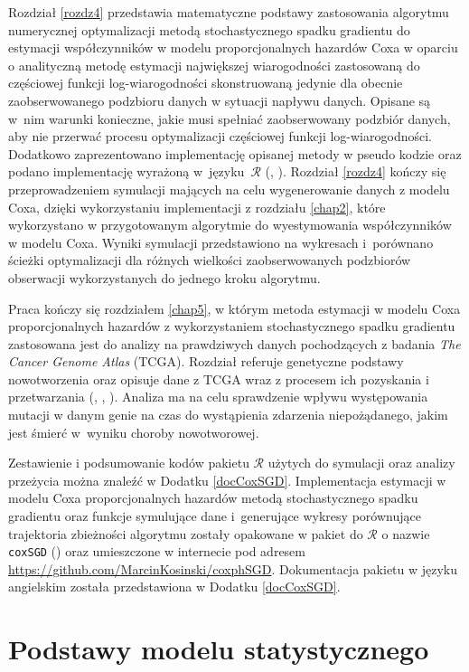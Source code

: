 Rozdział \ref{rozdz4} przedstawia matematyczne podstawy zastosowania algorytmu numerycznej optymalizacji metodą stochastycznego spadku gradientu do estymacji współczynników w modelu proporcjonalnych hazardów Coxa w oparciu o analityczną metodę estymacji największej wiarogodności zastosowaną do częściowej funkcji log-wiarogodności skonstruowaną jedynie dla obecnie zaobserwowanego podzbioru danych w sytuacji napływu danych. Opisane są w~nim warunki konieczne, jakie musi spełniać zaobserwowany podzbiór danych, aby nie przerwać procesu optymalizacji częściowej funkcji log-wiarogodności. Dodatkowo zaprezentowano implementację opisanej metody w pseudo kodzie oraz podano implementację wyrażoną w~języku~$\mathcal{R}$ (\cite{programikr}, \cite{biecek1}). Rozdział \ref{rozdz4} kończy się przeprowadzeniem symulacji mających na celu wygenerowanie danych z modelu Coxa, dzięki wykorzystaniu implementacji z rozdziału \ref{chap2}, które wykorzystano w przygotowanym algorytmie do wyestymowania współczynników w modelu Coxa. Wyniki symulacji przedstawiono na wykresach i~porównano ścieżki optymalizacji dla różnych wielkości zaobserwowanych podzbiorów obserwacji wykorzystanych do jednego kroku algorytmu. 

Praca kończy się rozdziałem \ref{chap5}, w którym metoda estymacji w modelu Coxa proporcjonalnych hazardów z wykorzystaniem stochastycznego spadku gradientu zastosowana jest do analizy na prawdziwych danych pochodzących z badania \textit{The Cancer Genome Atlas} (TCGA). Rozdział referuje genetyczne podstawy nowotworzenia oraz opisuje dane z TCGA wraz z procesem ich pozyskania i przetwarzania (\cite{kosa1}, \cite{kosa2}, \cite{kosa3}). Analiza ma na celu sprawdzenie wpływu występowania mutacji w danym genie na czas do wystąpienia zdarzenia niepożądanego, jakim jest śmierć w~wyniku choroby nowotworowej.

Zestawienie i podsumowanie kodów pakietu $\mathcal{R}$ użytych do symulacji oraz analizy przeżycia można znaleźć w Dodatku \ref{docCoxSGD}. Implementacja estymacji w modelu Coxa proporcjonalnych hazardów metodą stochastycznego spadku gradientu oraz funkcje symulujące dane i~generujące wykresy porównujące trajektoria zbieżności algorytmu zostały opakowane w pakiet do $\mathcal{R}$ o nazwie \texttt{coxSGD} (\cite{kosa0}) oraz umieszczone w internecie pod adresem \url{https://github.com/MarcinKosinski/coxphSGD}. Dokumentacja pakietu w języku angielskim została przedstawiona w Dodatku \ref{docCoxSGD}.

\chapter*{Podstawy modelu statystycznego}

